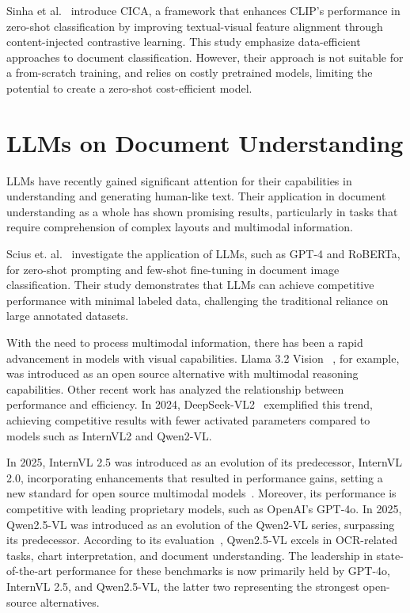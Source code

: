 Sinha et al.~\cite{sinha_cica_2024} introduce CICA, a framework that enhances CLIP's performance in zero-shot classification by improving textual-visual feature alignment through content-injected contrastive learning. This study emphasize data-efficient approaches to document classification. However, their approach is not suitable for a from-scratch training, and relies on costly pretrained models, limiting the potential to create a zero-shot cost-efficient model.

\section{LLMs on Document Understanding}

\glspl{LLM} have recently gained significant attention for their capabilities in understanding and generating human-like text. Their application in document understanding as a whole has shown promising results, particularly in tasks that require comprehension of complex layouts and multimodal information.

Scius et. al.~\cite{scius-bertrand_zero-shot_2025} investigate the application of \glspl{LLM}, such as GPT-4 and RoBERTa, for zero-shot prompting and few-shot fine-tuning in document image classification. Their study demonstrates that \glspl{LLM} can achieve competitive performance with minimal labeled data, challenging the traditional reliance on large annotated datasets.

With the need to process multimodal information, there has been a rapid advancement in models with visual capabilities. Llama 3.2 Vision ~\cite{ai_llama_2024}, for example, was introduced as an open source alternative with multimodal reasoning capabilities. Other recent work has analyzed the relationship between performance and efficiency. In 2024, DeepSeek-VL2~\cite{wu_deepseek-vl2_2024} exemplified this trend, achieving competitive results with fewer activated parameters compared to models such as InternVL2 and Qwen2-VL.

In 2025, InternVL 2.5 was introduced as an evolution of its predecessor, InternVL 2.0, incorporating enhancements that resulted in performance gains, setting a new standard for open source multimodal models~\cite{chen_expanding_2024}. Moreover, its performance is competitive with leading proprietary models, such as OpenAI’s GPT-4o\cite{openai_gpt-4o_2024,openai_hello_2024}.
In 2025, Qwen2.5-VL was introduced as an evolution of the Qwen2-VL series, surpassing its predecessor. According to its evaluation~\cite{bai_qwen25-vl_2025}, Qwen2.5-VL excels in OCR-related tasks, chart interpretation, and document understanding. The leadership in state-of-the-art performance for these benchmarks is now primarily held by GPT-4o, InternVL 2.5, and Qwen2.5-VL, the latter two representing the strongest open-source alternatives.
